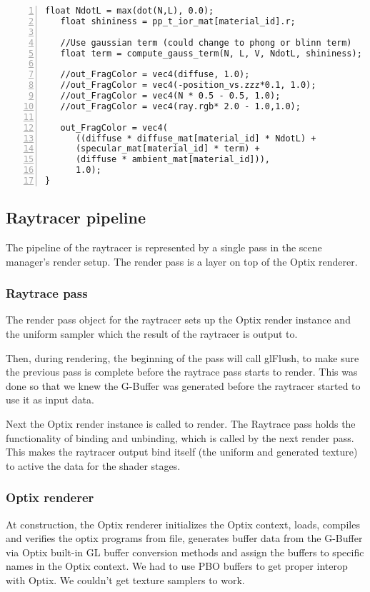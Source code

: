 \begin{Verbatim}[frame=single, numbers=left, label=Final fragment shader]
   float NdotL = max(dot(N,L), 0.0);
   float shininess = pp_t_ior_mat[material_id].r;
	
   //Use gaussian term (could change to phong or blinn term)
   float term = compute_gauss_term(N, L, V, NdotL, shininess);
    
   //out_FragColor = vec4(diffuse, 1.0);
   //out_FragColor = vec4(-position_vs.zzz*0.1, 1.0);
   //out_FragColor = vec4(N * 0.5 - 0.5, 1.0);
   //out_FragColor = vec4(ray.rgb* 2.0 - 1.0,1.0);
    
   out_FragColor = vec4( 
      ((diffuse * diffuse_mat[material_id] * NdotL) + 
      (specular_mat[material_id] * term) + 
      (diffuse * ambient_mat[material_id])), 
      1.0);
}
\end{Verbatim}

\subsection{Raytracer pipeline}
The pipeline of the raytracer is represented by a single pass in the scene manager's render setup. The render pass is a layer on top of the Optix renderer.

\subsubsection{Raytrace pass}
The render pass object for the raytracer sets up the Optix render instance and the uniform sampler which the result of the raytracer is output to.

Then, during rendering, the beginning of the pass will call glFlush, to make sure the previous pass is complete before the raytrace pass starts to render. This was done so that we knew the G-Buffer was generated before the raytracer started to use it as input data.

Next the Optix render instance is called to render.
The Raytrace pass holds the functionality of binding and unbinding, which is called by the next render pass. This makes the raytracer output bind itself (the uniform and generated texture) to active the data for the shader stages.

\subsubsection{Optix renderer}
At construction, the Optix renderer initializes the Optix context, loads, compiles and verifies the optix programs from file, generates buffer data from the G-Buffer via Optix built-in GL buffer conversion methods and assign the buffers to specific names in the Optix context. We had to use PBO buffers to get proper interop with Optix. We couldn't get texture samplers to work.

